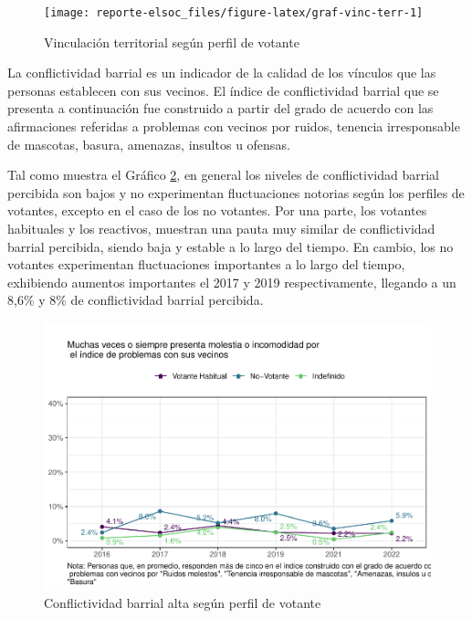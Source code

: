 \documentclass[
  12pt,
]{book}
\begin{document}
\begin{figure}

{\centering \texttt{[image: reporte-elsoc\_files/figure-latex/graf-vinc-terr-1]} 

}

\caption{Vinculación territorial según perfil de votante}\label{fig:graf-vinc-terr}
\end{figure}

La conflictividad barrial es un indicador de la calidad de los vínculos que las personas establecen con sus vecinos. El índice de conflictividad barrial que se presenta a continuación fue construido a partir del grado de acuerdo con las afirmaciones referidas a problemas con vecinos por ruidos, tenencia irresponsable de mascotas, basura, amenazas, insultos u ofensas.

Tal como muestra el Gráfico \ref{fig:confli-olas-part}, en general los niveles de conflictividad barrial percibida son bajos y no experimentan fluctuaciones notorias según los perfiles de votantes, excepto en el caso de los no votantes. Por una parte, los votantes habituales y los reactivos, muestran una pauta muy similar de conflictividad barrial percibida, siendo baja y estable a lo largo del tiempo. En cambio, los no votantes experimentan fluctuaciones importantes a lo largo del tiempo, exhibiendo aumentos importantes el 2017 y 2019 respectivamente, llegando a un 8,6\% y 8\% de conflictividad barrial percibida.

\begin{figure}

{\centering \includegraphics{reporte-elsoc_files/figure-latex/confli-olas-part-1} 

}

\caption{Conflictividad barrial alta según perfil de votante}\label{fig:confli-olas-part}
\end{figure}
\end{document}
